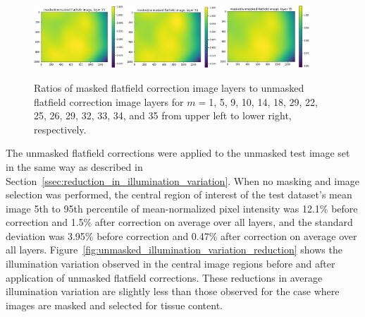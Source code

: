 \documentclass[letterpaper,11pt]{article}
\newcommand{\reffig}[1]{Figure~\ref{#1}}
\newcommand{\refsec}[1]{Section~\ref{#1}}
\begin{document}
\begin{figure}[!ht]
\includegraphics[width=0.3\textwidth]{images/results/masked_over_unmasked_flatfield_image_layers/masked_over_unmasked_flatfield_image_layer_33}
\includegraphics[width=0.3\textwidth]{images/results/masked_over_unmasked_flatfield_image_layers/masked_over_unmasked_flatfield_image_layer_34}
\includegraphics[width=0.3\textwidth]{images/results/masked_over_unmasked_flatfield_image_layers/masked_over_unmasked_flatfield_image_layer_35}
\caption{\footnotesize Ratios of masked flatfield correction image layers to unmasked flatfield correction image layers for $m=$1, 5, 9, 10, 14, 18, 29, 22, 25, 26, 29, 32, 33, 34, and 35 from upper left to lower right, respectively.}
\label{fig:masked_over_unmasked_flatfield_image_layers}
\end{figure}

The unmasked flatfield corrections were applied to the unmasked test image set in the same way as described in \refsec{ssec:reduction_in_illumination_variation}. When no masking and image selection was performed, the central region of interest of the test dataset's mean image 5th to 95th percentile of mean-normalized pixel intensity was 12.1\% before correction and 1.5\% after correction on average over all layers, and the standard deviation was 3.95\% before correction and 0.47\% after correction on average over all layers. \reffig{fig:unmasked_illumination_variation_reduction} shows the illumination variation observed in the central image regions before and after application of unmasked flatfield corrections. These reductions in average illumination variation are slightly less than those observed for the case where images are masked and selected for tissue content. 
\end{document}
